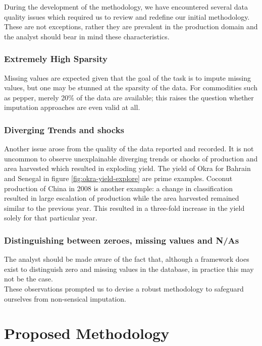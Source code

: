 \documentclass[nojss]{jss}\usepackage[]{graphicx}\usepackage[]{color}
\begin{document}
During the development of the methodology, we have encountered several
data quality issues which required us to review and redefine our
initial methodology. These are not exceptions, rather they are
prevalent in the production domain and the analyst should bear in mind
these characteristics.

\subsubsection{Extremely High Sparsity}
Missing values are expected given that the goal of the task is
to impute missing values, but one may be stunned at the sparsity of
the data. For commodities such as pepper, merely 20\% of the data are
available; this raises the question whether imputation approaches are
even valid at all.

\subsubsection{Diverging Trends and shocks}
Another issue arose from the quality of the data reported and
recorded. It is not uncommon to observe unexplainable diverging trends
or shocks of production and area harvested which resulted in exploding
yield. The yield of Okra for Bahrain and Senegal in figure
\ref{fig:okra-yield-explore} are prime examples. Coconut production of
China in 2008 is another example: a change in classification resulted
in large escalation of production while the area harvested remained
similar to the previous year. This resulted in a three-fold increase in the
yield solely for that particular year.\\

\subsubsection{Distinguishing between zeroes, missing values and N/As}
The analyst should be made aware of the fact that, although a framework
does exist to distinguish zero and missing values in the database, in
practice this may not be the case.\\

These observations prompted us to devise a robust methodology to safeguard
ourselves from non-sensical imputation.\\

\section{Proposed Methodology}
\end{document}
